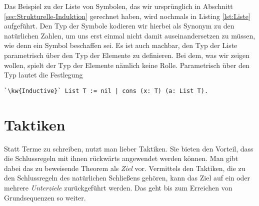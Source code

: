 Das Beispiel zu der Liste von Symbolen, das wir ursprünglich in Abschnitt
\ref{sec:Strukturelle-Induktion} gerechnet haben, wird nochmals in
Listing \ref{lst:Liste} aufgeführt. Den Typ der Symbole kodieren wir hierbei
als Synonym zu den natürlichen Zahlen, um uns erst einmal nicht damit
auseinandersetzen zu müssen, wie denn ein Symbol beschaffen sei. Es ist
auch machbar, den Typ der Liste parametrisch über den Typ der Elemente
zu definieren. Bei dem, was wir zeigen wollen, spielt der Typ der Elemente
nämlich keine Rolle. Parametrisch über den Typ  lautet die
Festlegung
\begin{lstlisting}[escapechar=`, xleftmargin=\mathindent]
`\kw{Inductive}` List T := nil | cons (x: T) (a: List T).
\end{lstlisting}

\section{Taktiken}

Statt Terme zu schreiben, nutzt man lieber Taktiken. Sie bieten den
Vorteil, dass die Schlussregeln mit ihnen rückwärts angewendet werden
können. Man gibt dabei das zu beweisende Theorem als \emph{Ziel}
vor. Vermittels den Taktiken, die zu den Schlussregeln des natürlichen
Schließens gehören, kann das Ziel auf ein oder mehrere \emph{Unterziele}%
 zurückgeführt werden. Das geht bis zum Erreichen
von Grundsequenzen so weiter.

